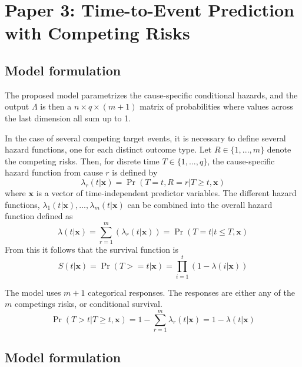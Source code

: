 \chapter{Paper 3: Time-to-Event Prediction with Competing Risks}
\label{results-paper-3}

\section{Model formulation}

The proposed model parametrizes the cause-specific conditional hazards,
and the output \(\Lambda\) is then a 
\(n \times q \times (m + 1)\) matrix of probabilities
where values across the last dimension all sum up to 1.


In the case of several competing target events,
it is necessary to define several hazard functions,
one for each distinct outcome type.
Let \(R \in \{1, ..., m\}\) denote the competing risks.
Then, for disrete time \(T \in \{1, ..., q\}\), 
the cause-specific hazard function from cause $r$ is defined by
%
\begin{equation*}
    \lambda_{r}(t | \mathbf{x}) = \Pr (T = t, R = r | T \geq t, \mathbf{x})
\end{equation*}
%
where \(\mathbf{x}\) is a vector of time-independent predictor variables. 
The different hazard functions, 
\(\lambda_{1}(t|\mathbf{x}), ..., \lambda_{m}(t|\mathbf{x})\) 
can be combined into the overall hazard function defined as
%
\begin{equation}
    \lambda(t|\mathbf{x}) 
    = \sum_{r=1}^{m}(\lambda_{r}(t|\mathbf{x}))
    = \Pr(T = t | t \leq T, \mathbf{x})
\end{equation}
%
From this it follows that the survival function is
%
\begin{equation}
    S(t|\mathbf{x})
    = \Pr(T >= t|\mathbf{x})
    = \prod_{i=1}^{t}(1 - \lambda(i|\mathbf{x}))
\end{equation}

The model uses $m + 1$ categorical responses.
The responses are either any of the $m$ competings risks, 
or conditional survival.
%
\begin{equation}
    \Pr(T > t | T \geq t, \mathbf{x})
    = 1 - \sum_{r = 1}^{m} \lambda_r (t | \mathbf{x})
    = 1 - \lambda (t | \mathbf{x})
\end{equation}

\section{Model formulation}

